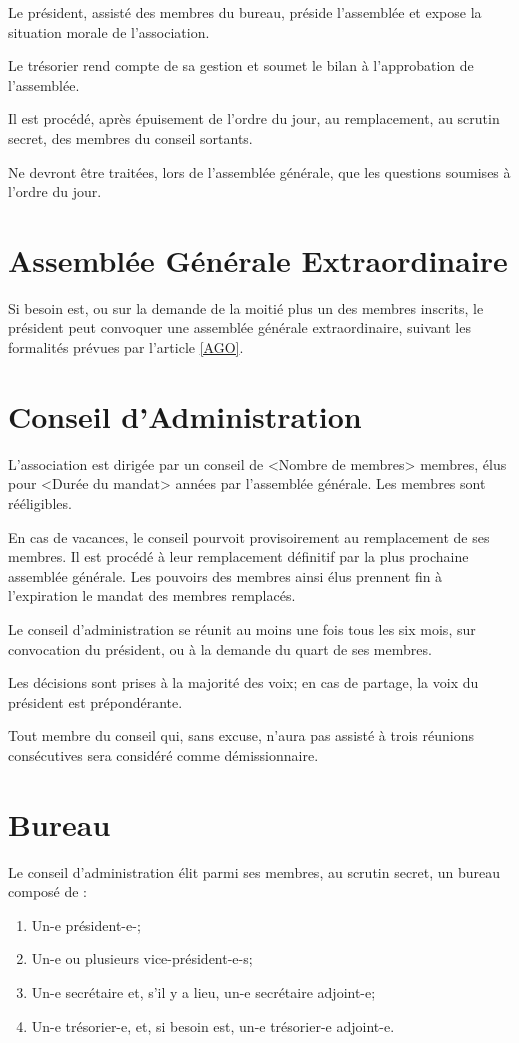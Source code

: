 \documentclass[12pt]{constitution}
\begin{document}
\medskip
Le président, assisté des membres du bureau, préside l'assemblée et expose la situation morale de l’association.

Le trésorier rend compte de sa gestion et soumet le bilan à l’approbation de l’assemblée.

Il est procédé, après épuisement de l’ordre du jour, au remplacement, au scrutin secret, des membres du conseil sortants.

\medskip
Ne devront être traitées, lors de l’assemblée générale, que les questions soumises à l’ordre du jour.

\section{Assemblée Générale Extraordinaire}
Si besoin est, ou sur la demande de la moitié plus un des membres inscrits, le président peut convoquer une assemblée générale extraordinaire, suivant les formalités prévues par l’article \ref{AGO}.

\section{Conseil d'Administration}
L'association est dirigée par un conseil de <Nombre de membres> membres, élus pour <Durée du mandat> années par l'assemblée générale. Les membres sont rééligibles.

En cas de vacances, le conseil pourvoit provisoirement au remplacement de ses membres. Il est procédé à leur remplacement définitif par la plus prochaine assemblée générale. Les pouvoirs des membres ainsi élus prennent fin à l'expiration le mandat des membres remplacés.

\medskip
Le conseil d'administration se réunit au moins une fois tous les six mois, sur convocation du président, ou à la demande du quart de ses membres.

Les décisions sont prises à la majorité des voix; en cas de partage, la voix du président est prépondérante. 

\medskip
Tout membre du conseil qui, sans excuse, n'aura pas assisté à trois réunions consécutives sera considéré comme démissionnaire. 

\section{Bureau}
Le conseil d'administration élit parmi ses membres, au scrutin secret, un bureau composé de :
\begin{enumerate}
	\item Un-e président-e-;
	\item Un-e ou plusieurs vice-président-e-s;
	\item Un-e secrétaire et, s'il y a lieu, un-e secrétaire adjoint-e;
	\item Un-e trésorier-e, et, si besoin est, un-e trésorier-e adjoint-e. 
\end{enumerate}
\end{document}
